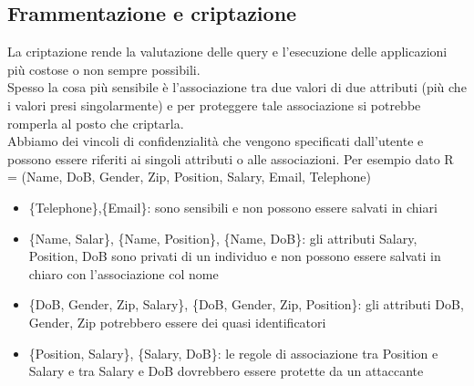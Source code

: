 \subsection{Frammentazione e criptazione}
La criptazione rende la valutazione delle query e l'esecuzione delle applicazioni più costose o non sempre possibili.\\
Spesso la cosa più sensibile è l'associazione tra due valori di due attributi (più che i valori presi singolarmente) e per proteggere tale associazione si potrebbe romperla al posto che criptarla.\\
Abbiamo dei vincoli di confidenzialità che vengono specificati dall'utente e possono essere riferiti ai singoli attributi o alle associazioni. Per esempio dato R = (Name, DoB, Gender, Zip, Position, Salary, Email, Telephone)
\begin{itemize}
    \item \{Telephone\},\{Email\}: sono sensibili e non possono essere salvati in chiari
    \item \{Name, Salar\}, \{Name, Position\}, \{Name, DoB\}: gli attributi Salary, Position, DoB sono privati di un individuo e non possono essere salvati in chiaro con l'associazione col nome
    \item \{DoB, Gender, Zip, Salary\}, \{DoB, Gender, Zip, Position\}: gli attributi DoB, Gender, Zip potrebbero essere dei quasi identificatori
    \item \{Position, Salary\}, \{Salary, DoB\}: le regole di associazione tra Position e Salary e tra Salary e DoB dovrebbero essere protette da un attaccante 
\end{itemize}

